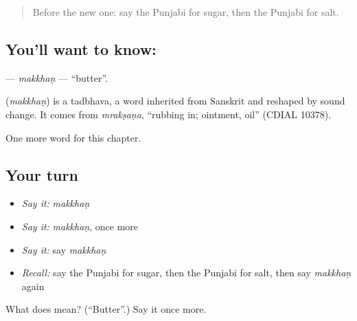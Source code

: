 \label{lesson:PA-C65-makkhan}



\begin{quote}
Before the new one: say the Punjabi for sugar, then the Punjabi for salt.
\end{quote}

\subsection*{You'll want to know: }
\textbf{} — \emph{makkhaṇ} — \textquotedblleft{}butter\textquotedblright{}.

\begin{cousinweb}
\textbf{} (\emph{makkhaṇ}) is a tadbhava, a word inherited from Sanskrit and reshaped by sound change. It comes from \emph{mrakṣaṇa}, \textquotedblleft{}rubbing in; ointment, oil\textquotedblright{} (CDIAL 10378).
\end{cousinweb}

\begin{grammarlens}[title={What you've built}]
One more word for this chapter.
\end{grammarlens}

\subsection*{Your turn}
\begin{itemize}
\raggedright
  \item \emph{Say it:} \emph{makkhaṇ}
  \item \emph{Say it:} \emph{makkhaṇ}, once more
  \item \emph{Say it:} say \emph{makkhaṇ}
  \item \emph{Recall:} say the Punjabi for sugar, then the Punjabi for salt, then say \emph{makkhaṇ} again
\end{itemize}

\begin{tcolorbox}[breakable,colback=teal!4,colframe=teal!35!black,title={Before you move on}]
What does  mean? (\textquotedblleft{}Butter\textquotedblright{}.) Say it once more.
\end{tcolorbox}
